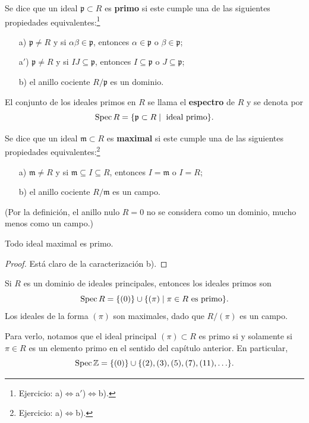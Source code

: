 \begin{definicion}
  Se dice que un ideal $\mathfrak{p} \subset R$ es \textbf{primo} si este cumple
  una de las siguientes propiedades equivalentes:\footnote{Ejercicio:
    a)$\iff$a${}'$)$\iff$b).}
  \begin{enumerate}
  \item[a)] $\mathfrak{p} \ne R$ y si $\alpha\beta \in \mathfrak{p}$, entonces
    $\alpha \in \mathfrak{p}$ o $\beta \in \mathfrak{p}$;

  \item[a${}'$)] $\mathfrak{p} \ne R$ y si $IJ \subseteq \mathfrak{p}$, entonces
    $I \subseteq \mathfrak{p}$ o $J \subseteq \mathfrak{p}$;
  
  \item[b)] el anillo cociente $R/\mathfrak{p}$ es un dominio.
  \end{enumerate}

  El conjunto de los ideales primos en $R$ se llama el \textbf{espectro}
  de $R$ y se denota por
  $$\operatorname{Spec} R = \{ \mathfrak{p} \subset R \mid \text{ ideal primo} \}.$$

  Se dice que un ideal $\mathfrak{m} \subset R$ es \textbf{maximal} si este
  cumple una de las siguientes propiedades equivalentes:\footnote{Ejercicio:
    a)$\iff$b).}
  \begin{enumerate}
  \item[a)] $\mathfrak{m} \ne R$ y si $\mathfrak{m} \subseteq I \subseteq R$,
    entonces $I = \mathfrak{m}$ o $I = R$;

  \item[b)] el anillo cociente $R/\mathfrak{m}$ es un campo.
  \end{enumerate}
\end{definicion}
(Por la definición, el anillo nulo $R = 0$ no se considera como un dominio,
mucho menos como un campo.)

\begin{proposicion}
  Todo ideal maximal es primo.

  \begin{proof}
    Está claro de la caracterización b).
  \end{proof}
\end{proposicion}

\begin{ejemplo}
  Si $R$ es un dominio de ideales principales, entonces los ideales primos son
  $$\operatorname{Spec} R = \{ (0) \} \cup \{ (\pi) \mid \pi \in R \text{ es primo} \}.$$
  Los ideales de la forma $(\pi)$ son maximales, dado que $R/(\pi)$ es un campo.

  Para verlo, notamos que el ideal principal $(\pi) \subset R$ es primo si y
  solamente si $\pi \in R$ es un elemento primo en el sentido del capítulo
  anterior. En particular,
  \[ \operatorname{Spec} \mathbb{Z} = \{ (0) \} \cup \{ (2), (3), (5), (7), (11), \ldots \}. \qedhere \]
\end{ejemplo}

